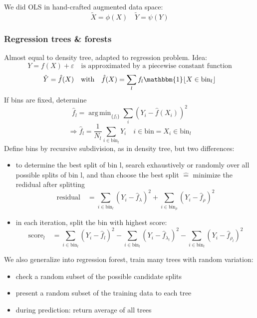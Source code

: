 \documentclass[11pt]{article}
\DeclareMathOperator*{\argmin}{arg\,min}
\DeclarePairedDelimiter\floor{\lfloor}{\rfloor}
\begin{document}
    We did OLS in hand-crafted augmented data space:
    \begin{equation*}
      \tilde{X}=\phi(X) \quad \tilde{Y}=\psi(Y)
    \end{equation*}
    \subsubsection{Regression trees & forests}
    Almost equal to density tree, adapted to regression problem. Idea:
    \begin{equation*}
      Y=f(X)+\varepsilon \quad \text{is approximated by a piecewise constant function}
    \end{equation*}
    \begin{equation*}
      \hat{Y}=\hat{f}(X) \quad \text{with} \quad \hat{f}(X)=\sum_l f_l \mathbbm{1}\floor{X \in \text{bin}_l}
    \end{equation*}
    If bins are fixed, determine
    \begin{equation*}
      \hat{f}_l=\argmin_{\{ f_l \}} \sum_i (Y_i-\hat{f}(X_i))^2
    \end{equation*}
    \begin{equation*}
      \Rightarrow \hat{f}_l=\frac{1}{N_l} \sum_{i \in \text{bin}_l} Y_i
      \quad i \in \text{bin} \widehat{=} X_i \in \text{bin}_l
    \end{equation*}
    Define bins by recursive subdivision, as in density tree, but two differences:
    \begin{itemize}
      \item to determine the best split of bin l, search exhaustively or
      randomly over all possible splits of bin l, and than choose the best split
      $\widehat{=}$ minimize the redidual after splitting
      \begin{equation*}
        \text{residual} \quad = \sum_{i \in \text{bin}_l} (Y_i-\hat{f}_\lambda)^2+\sum_{i \in \text{bin}_
        \rho}(Y_i -\hat{f}_\rho)^2
      \end{equation*}
      \item in each iteration, split the bin with highest score:
      \begin{equation*}
        \text{score}_l \quad = \sum_{i \in \text{bin}_l}(Y_i-\hat{f}_l)^2-
        \sum_{i \in \text{bin}_l}(Y_i-\hat{f}_{\lambda_l})^2-
        \sum_{i \in \text{bin}_l}(Y_i-\hat{f}_{\rho_l})^2
      \end{equation*}
    \end{itemize}
    We also generalize into regression forest, train many trees with random variation:
    \begin{itemize}
      \item check a random subset of the possible candidate splits
      \item present a random subset of the training data to each tree
      \item during prediction: return average of all trees
    \end{itemize}
\end{document}
